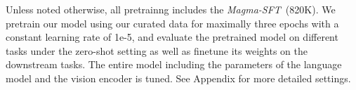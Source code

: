Unless noted otherwise, all pretrainng includes the \textit{Magma-SFT}~(820K). We pretrain our model using our curated data for maximally three epochs with a constant learning rate of 1e-5, and evaluate the pretrained model on different tasks under the zero-shot setting as well as finetune its weights on the downstream tasks. The entire model including the parameters of the language model and the vision encoder is tuned. See Appendix for more detailed settings.
